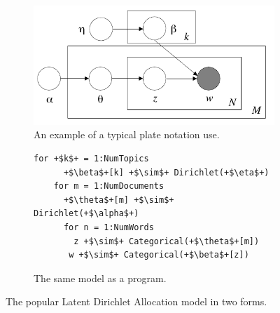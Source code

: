 \documentclass{article} %
\begin{document}


\begin{figure}[h]
\centering
\begin{subfigure}{.5\textwidth}
  \centering
\includegraphics[width=.7\linewidth]{./figures/lda_plate_blei.pdf}
  \caption{An example of a typical plate notation use. \label{fig:lda_plate}}

\end{subfigure}%
\begin{subfigure}{.4\textwidth}
	\begin{lstlisting}[frame=single, numbers=none, xleftmargin=0pt]
	for +$k$+ = 1:NumTopics
	  +$\beta$+[k] +$\sim$+ Dirichlet(+$\eta$+)
	for m = 1:NumDocuments
	  +$\theta$+[m] +$\sim$+ Dirichlet(+$\alpha$+) 
	  for n = 1:NumWords 
	    z +$\sim$+ Categorical(+$\theta$+[m])
	   w +$\sim$+ Categorical(+$\beta$+[z])
	\end{lstlisting}
  \caption{The same model as a program.}
  \label{fig:lda_code}
\end{subfigure}
\caption{The popular Latent Dirichlet Allocation model in two forms.}
\label{fig:lda}
\end{figure}




\end{document}
